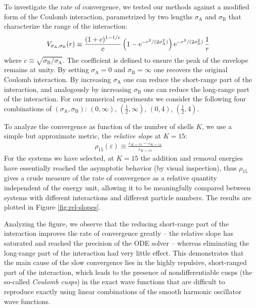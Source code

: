 To investigate the rate of convergence, we tested our methods against a modified form of the Coulomb interaction, parametrized by two lengths $\sigma_{\mathrm{A}}$ and $\sigma_{\mathrm{B}}$ that characterize the range of the interaction:
\begin{align}
  V_{\sigma_{\mathrm{A}}, \sigma_{\mathrm{B}}}(r) \equiv \frac{(1 + c)^{1 - 1/c}}{c} \left(1 - \operatorname{e}^{-r^2 / (2 \sigma_{\mathrm{A}}^2)}\right) \operatorname{e}^{-r^2 / (2 \sigma_{\mathrm{B}}^2)} \frac{1}{r}
\end{align}
where $c \equiv \sqrt{\sigma_{\mathrm{B}} / \sigma_{\mathrm{A}}}$.  The coefficient is defined to ensure the peak of the envelope remains at unity.  By setting $\sigma_{\mathrm{A}} = 0$ and $\sigma_{\mathrm{B}} = \infty$ one recovers the original Coulomb interaction.  By increasing $\sigma_{\mathrm{A}}$ one can reduce the short-range part of the interaction, and analogously by increasing $\sigma_{\mathrm{B}}$ one can reduce the long-range part of the interaction.  For our numerical experiments we consider the following four combinations of $(\sigma_{\mathrm{A}}, \sigma_{\mathrm{B}})$: $(0, \infty)$, $(\frac{1}{2}, \infty)$, $(0, 4)$, $(\frac{1}{2}, 4)$.

To analyze the convergence as function of the number of shells $K$, we use a simple but approximate metric, the \textit{relative slope} at $K = 15$:
\begin{align*}
  \rho_{15}(\varepsilon) \equiv \frac{\varepsilon_{K = 15} - \varepsilon_{K = 14}}{\varepsilon_{K = 15}}
\end{align*}
For the systems we have selected, at $K = 15$ the addition and removal energies have essentially reached the asymptotic behavior (by visual inspection), thus $\rho_{15}$ gives a crude measure of the rate of convergence as a relative quantity independent of the energy unit, allowing it to be meaningfully compared between systems with different interactions and different particle numbers.  The results are plotted in Figure \ref{fig:rel-slopes}.

Analyzing the figure, we observe that the reducing short-range part of the interaction improves the rate of convergence greatly -- the relative slope has saturated and reached the precision of the ODE solver -- whereas eliminating the long-range part of the interaction had very little effect.  This demonstrates that the main cause of the slow convergence lies in the highly repulsive, short-ranged part of the interaction, which leads to the presence of nondifferentiable cusps (the so-called \textit{Coulomb cusps}) in the exact wave functions that are difficult to reproduce exactly using linear combinations of the smooth harmonic oscillator wave functions.

